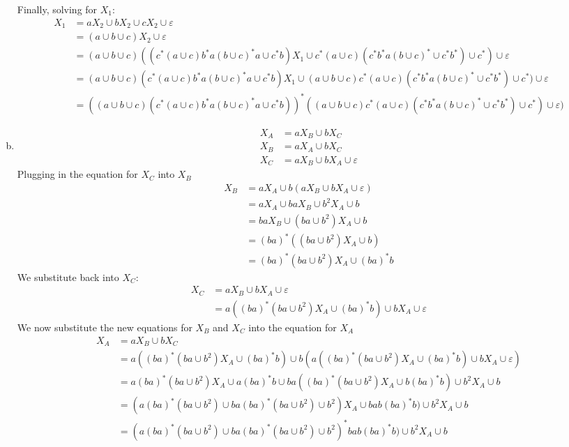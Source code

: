 \begin{solution}
\begin{enumerate}[(a)]
    Finally, solving for \(X_1\):
    \begin{align*}
        X_1 &= aX_2\cup bX_2\cup cX_2\cup\varepsilon\\
            &= (a\cup b\cup c)X_2\cup\varepsilon\\
            &= (a\cup b\cup c)((c^*(a\cup c)b^*a(b\cup c)^*a\cup c^*b)X_1\cup c^*(a\cup c)(c^*b^*a(b\cup c)^*\cup c^*b^*)\cup c^*)\cup\varepsilon\\
            &= (a\cup b\cup c)(c^*(a\cup c)b^*a(b\cup c)^*a\cup c^*b)X_1\cup (a\cup b\cup c)c^*(a\cup c)(c^*b^*a(b\cup c)^*\cup c^*b^*)\cup c^*)\cup\varepsilon\\
            &= \left((a\cup b\cup c)(c^*(a\cup c)b^*a(b\cup c)^*a\cup c^*b)\right)^*((a\cup b\cup c)c^*(a\cup c)(c^*b^*a(b\cup c)^*\cup c^*b^*)\cup c^*)\cup\varepsilon)
    \end{align*}
        \item
    \begin{align*}
        X_A &= aX_B\cup bX_C\\
        X_B &= aX_A\cup bX_C\\
        X_C &= aX_B\cup bX_A\cup\varepsilon
    \end{align*}
    Plugging in the equation for \(X_C\) into \(X_B\)
    \begin{align*}
        X_B &= aX_A\cup b(aX_B\cup bX_A\cup\varepsilon)\\
            &= aX_A\cup baX_B\cup b^2X_A\cup b\\
            &= baX_B\cup (ba\cup b^2)X_A\cup b\\
            &= (ba)^*((ba\cup b^2)X_A\cup b)\\
            &= (ba)^*(ba\cup b^2)X_A\cup (ba)^*b
    \end{align*}
    We substitute back into \(X_C\):
    \begin{align*}
        X_C &= aX_B\cup bX_A\cup\varepsilon\\
            &= a((ba)^*(ba\cup b^2)X_A\cup (ba)^*b)\cup bX_A\cup\varepsilon
    \end{align*}
    We now substitute the new equations for \(X_B\) and \(X_C\) into the equation for \(X_A\)
    \begin{align*}
        X_A &= aX_B\cup bX_C\\
            &= a((ba)^*(ba\cup b^2)X_A\cup (ba)^*b)\cup b(a((ba)^*(ba\cup b^2)X_A\cup (ba)^*b)\cup bX_A\cup\varepsilon)\\
            &= a(ba)^*(ba\cup b^2)X_A\cup a(ba)^*b\cup ba((ba)^*(ba\cup b^2)X_A\cup b(ba)^*b)\cup b^2X_A\cup b\\
            &= (a(ba)^*(ba\cup b^2)\cup ba(ba)^*(ba\cup b^2)\cup b^2)X_A\cup bab(ba)^*b)\cup b^2X_A\cup b\\
            &= (a(ba)^*(ba\cup b^2)\cup ba(ba)^*(ba\cup b^2)\cup b^2)^*bab(ba)^*b)\cup b^2X_A\cup b
    \end{align*}
    \end{enumerate}
\end{solution}

